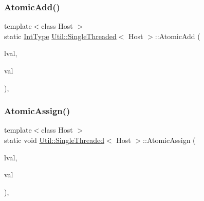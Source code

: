\mbox{\label{classUtil_1_1SingleThreaded_a8ecefde4f84af6dc4632e82d4898da2e}} 
\subsubsection{\texorpdfstring{AtomicAdd()}{AtomicAdd()}\hspace{0.1cm}{\footnotesize\ttfamily [3/3]}}
{\footnotesize\ttfamily template$<$class Host $>$ \\
static \mbox{\hyperlink{classUtil_1_1SingleThreaded_a35932213fb0c15a7b67ced79bc2af4c6}{Int\+Type}} \mbox{\hyperlink{classUtil_1_1SingleThreaded}{Util\+::\+Single\+Threaded}}$<$ Host $>$\+::Atomic\+Add (\begin{DoxyParamCaption}\item[{volatile \mbox{\hyperlink{classUtil_1_1SingleThreaded_a35932213fb0c15a7b67ced79bc2af4c6}{Int\+Type}} \&}]{lval,  }\item[{\mbox{\hyperlink{classUtil_1_1SingleThreaded_a35932213fb0c15a7b67ced79bc2af4c6}{Int\+Type}}}]{val }\end{DoxyParamCaption})\hspace{0.3cm}{\ttfamily [inline]}, {\ttfamily [static]}}

\mbox{\label{classUtil_1_1SingleThreaded_a712bba75b676a88de414ccbd4df775eb}} 
\subsubsection{\texorpdfstring{AtomicAssign()}{AtomicAssign()}\hspace{0.1cm}{\footnotesize\ttfamily [1/6]}}
{\footnotesize\ttfamily template$<$class Host $>$ \\
static void \mbox{\hyperlink{classUtil_1_1SingleThreaded}{Util\+::\+Single\+Threaded}}$<$ Host $>$\+::Atomic\+Assign (\begin{DoxyParamCaption}\item[{volatile \mbox{\hyperlink{classUtil_1_1SingleThreaded_a35932213fb0c15a7b67ced79bc2af4c6}{Int\+Type}} \&}]{lval,  }\item[{\mbox{\hyperlink{classUtil_1_1SingleThreaded_a35932213fb0c15a7b67ced79bc2af4c6}{Int\+Type}}}]{val }\end{DoxyParamCaption})\hspace{0.3cm}{\ttfamily [inline]}, {\ttfamily [static]}}

